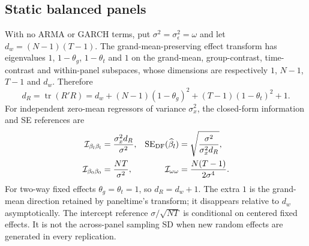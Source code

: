 \documentclass[12pt]{article}
\begin{document}
\subsection{Static balanced panels}\label{sec:df-static-panel}
With no ARMA or GARCH terms, put $\sigma^2=\sigma_\epsilon^2=\omega$ and let
$d_w=(N-1)(T-1)$. The grand-mean-preserving effect transform has eigenvalues
$1$, $1-\theta_g$, $1-\theta_t$ and $1$ on the grand-mean, group-contrast,
time-contrast and within-panel subspaces, whose dimensions are respectively
$1$, $N-1$, $T-1$ and $d_w$. Therefore
\begin{equation}
d_R=\operatorname{tr}(R'R)
=d_w+(N-1)(1-\theta_g)^2+(T-1)(1-\theta_t)^2+1.
\label{eq:df-static-trace}
\end{equation}
For independent zero-mean regressors of variance $\sigma_x^2$, the closed-form information and SE references are
\begin{equation}
\begin{aligned}
\mathcal I_{\beta_l\beta_l}&=\frac{\sigma_x^2d_R}{\sigma^2},&
\operatorname{SE}_{\rm DF}(\widehat\beta_l)&=\sqrt{\frac{\sigma^2}{\sigma_x^2d_R}},\\
\mathcal I_{\beta_0\beta_0}&=\frac{NT}{\sigma^2},&
\mathcal I_{\omega\omega}&=\frac{N(T-1)}{2\sigma^4}.
\end{aligned}
\label{eq:df-static-information}
\end{equation}
For two-way fixed effects $\theta_g=\theta_t=1$, so $d_R=d_w+1$.
The extra $1$ is the grand-mean direction retained by paneltime's transform; it disappears relative to $d_w$ asymptotically. The intercept reference
$\sigma/\sqrt{NT}$ is conditional on centered fixed effects. It is not the across-panel sampling SD when new random effects are generated in every replication.
\end{document}
